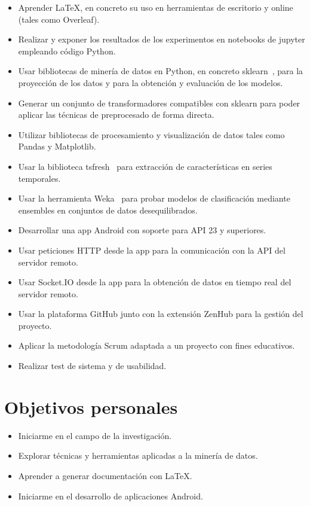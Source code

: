 \begin{itemize}
	\item Aprender \LaTeX{}, en concreto su uso en herramientas de escritorio y online (tales como Overleaf).  
	\item Realizar y exponer los resultados de los experimentos en notebooks de jupyter empleando código Python. 
	\item Usar bibliotecas de minería de datos en Python, en concreto sklearn~\cite{scikit-learn}, para la proyección de los datos y para la obtención y evaluación de los modelos.
	\item Generar un conjunto de transformadores compatibles con sklearn para poder aplicar las técnicas de preprocesado de forma directa.
	\item Utilizar bibliotecas de procesamiento y visualización de datos tales como Pandas y Matplotlib.  
	\item Usar la biblioteca tsfresh~\cite{christ2018time} para extracción de características en series temporales. 
	\item Usar la herramienta Weka~\cite{hall2009weka} para probar modelos de clasificación mediante ensembles en conjuntos de datos desequilibrados. 
	\item Desarrollar una app Android con soporte para API 23 y superiores. 
	\item Usar peticiones HTTP desde la app para la comunicación con la API del servidor remoto. 
	\item Usar Socket.IO desde la app para la obtención de datos en tiempo real del servidor remoto.
	\item Usar la plataforma GitHub junto con la extensión ZenHub para la gestión del proyecto. 
	\item Aplicar la metodología Scrum adaptada a un proyecto con fines educativos. 
	\item Realizar test de sistema y de usabilidad. 
	
	
\end{itemize}

\section{Objetivos personales}

\begin{itemize}
	\item Iniciarme en el campo de la investigación. 
	\item Explorar técnicas y herramientas aplicadas a la minería de datos. 
	\item Aprender a generar documentación con \LaTeX{}. 
	\item Iniciarme en el desarrollo de aplicaciones Android. 
\end{itemize}
